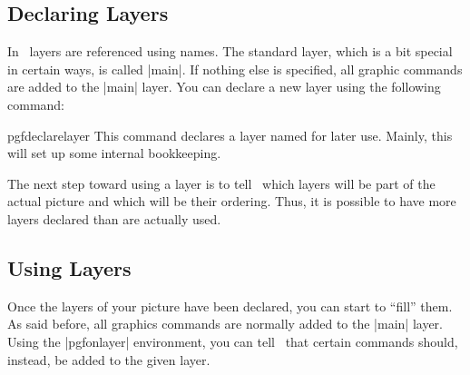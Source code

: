 \subsection{Declaring Layers}

In \pgfname\ layers are referenced using names. The standard layer,
which is a bit special in certain ways, is called |main|. If nothing
else is specified, all graphic commands are added to the |main|
layer. You can declare a new layer using the following command:

\begin{docCommand}{pgfdeclarelayer}{}
  This command declares a layer named  for later
  use. Mainly, this will set up some internal bookkeeping.
\end{docCommand}

The next step toward using a layer is to tell \pgfname\ which layers
will be part of the actual picture and which will be their
ordering. Thus, it is possible to have more layers declared than are
actually used.



\subsection{Using Layers}

Once the layers of your picture have been declared, you can start to
``fill'' them. As said before, all graphics commands are normally
added to the |main| layer. Using the |{pgfonlayer}| environment, you
can tell \pgfname\ that certain commands should, instead, be added to
the given layer.

